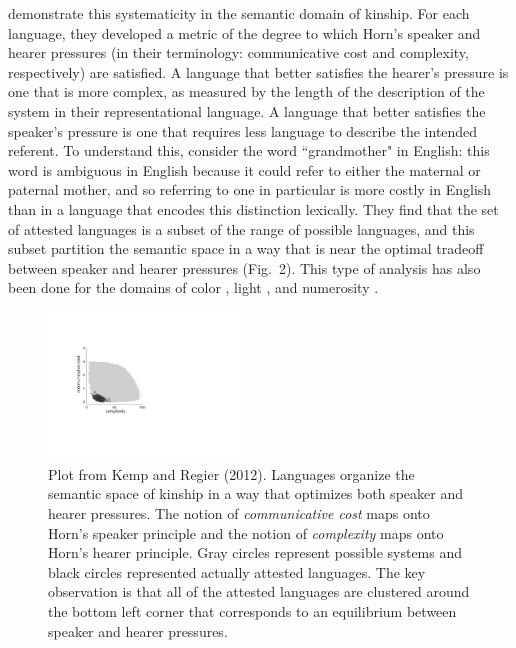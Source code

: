 \documentclass[man, noapacite, 12pt]{apa2}
\begin{document}
  demonstrate this systematicity in the semantic domain of kinship. For each language, they developed a metric of the degree to which  Horn's speaker and hearer pressures (in their terminology: communicative cost and complexity, respectively) are satisfied. A language that better satisfies the hearer's pressure is one that is more complex, as measured by the length of the description of the system in their representational language. A language that better satisfies the speaker's pressure is one that requires less language to describe the intended referent. To understand this, consider the word ``grandmother" in English: this word is ambiguous in English because it could refer to either the maternal or paternal mother, and so referring to one in particular is more costly in English than in a language that encodes this distinction lexically. They find that the set of attested languages is a subset of the range of possible languages, and this subset partition the  semantic space in a way that is near the optimal tradeoff between speaker and hearer pressures (Fig.\ 2). This type of analysis has also been done for the domains of color \cite{regier2007color}, light \cite{baddeley2009relationship}, and numerosity \cite{xu4numeral}.
 
 \begin{figure}
\begin{center} 
\includegraphics[width=2in]{figs/kemp2012.pdf}
\caption{\label{fig:frank2012} Plot  from Kemp and Regier (2012). Languages organize the semantic space of kinship in a way that optimizes both speaker and hearer pressures. The notion of {\it communicative cost} maps onto Horn's speaker principle and the notion of {\it complexity} maps onto Horn's hearer principle. Gray circles represent possible systems and black circles represented actually attested languages. The key observation is that all of the attested languages are clustered around the bottom left corner that corresponds to an equilibrium between speaker and hearer pressures.} 
\end{center} 
\end{figure}
\end{document}
